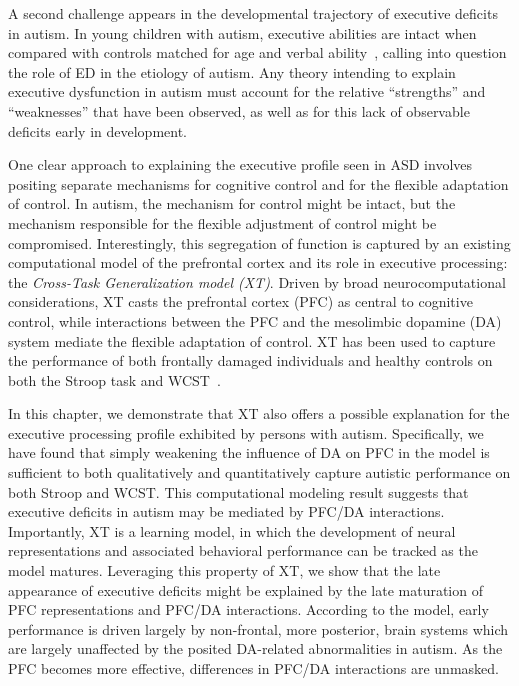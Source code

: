 \documentclass[man]{apa}
\begin{document}
A second challenge appears in the developmental trajectory of
executive deficits in autism.  In young children with autism,
executive abilities are intact when compared with controls matched for
age and verbal ability~\cite{GriffithEM:1999:AutismYoungED}, calling
into question the role of ED in the etiology of autism.  Any theory
intending to explain executive dysfunction in autism must account for
the relative ``strengths'' and ``weaknesses'' that have been observed,
as well as for this lack of observable deficits early in development.

One clear approach to explaining the executive profile seen in ASD
involves positing separate mechanisms for cognitive control and for
the flexible adaptation of control.  In autism, the mechanism for
control might be intact, but the mechanism responsible for the flexible
adjustment of control might be compromised.  Interestingly, this
segregation of function is captured by an existing computational model
of the prefrontal cortex and its role in executive processing: the
\emph{Cross-Task Generalization model (XT)}.  Driven by broad
neurocomputational considerations, XT casts the prefrontal cortex
(PFC) as central to cognitive control, while interactions between the
PFC and the mesolimbic dopamine (DA) system mediate the flexible
adaptation of control.  XT has been used to capture the performance of
both frontally damaged individuals and healthy controls on both the
Stroop task and WCST~\cite{RougierNP:2005:XT}.

In this chapter, we demonstrate that XT also offers a possible explanation for
the executive processing profile exhibited by persons with autism.
Specifically, we have found that simply weakening the influence of DA
on PFC in the model is sufficient to both qualitatively and
quantitatively capture autistic performance on both Stroop and WCST.
This computational modeling result suggests that executive deficits in
autism may be mediated by PFC/DA interactions.  Importantly, XT is a
learning model, in which the development of neural representations and
associated behavioral performance can be tracked as the model matures.
Leveraging this property of XT, we show that the late appearance of
executive deficits might be explained by the late maturation of PFC
representations and PFC/DA interactions.  According to the model,
early performance is driven largely by non-frontal, more posterior,
brain systems which are largely unaffected by the posited DA-related
abnormalities in autism.  As the PFC becomes more effective,
differences in PFC/DA interactions are unmasked.
\end{document}
